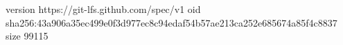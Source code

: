 version https://git-lfs.github.com/spec/v1
oid sha256:43a906a35ec499e0f3d977ec8c94edaf54b57ae213ca252e685674a85f4c8837
size 99115
